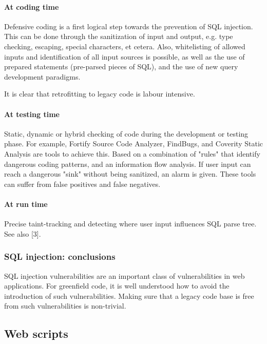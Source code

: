 \paragraph{At coding time}

Defensive coding is a first logical step towards the prevention of SQL injection. This can be done through the sanitization of input and output, e.g. type checking, escaping, special characters, et cetera. Also, whitelisting of allowed inputs and identification of all input sources is possible, as well as the use of prepared statements (pre-parsed pieces of SQL), and the use of new query development paradigms.

It is clear that retrofitting to legacy code is labour intensive.


\paragraph{At testing time}

Static, dynamic or hybrid checking of code during the development or testing phase. For example, Fortify Source Code Analyzer, FindBugs, and Coverity Static Analysis are tools to achieve this. Based on a combination of "rules" that identify dangerous coding patterns, and an information flow analysis. If user input can reach a dangerous "sink" without being sanitized, an alarm is given. These tools can suffer from false positives and false negatives.


\paragraph{At run time}

Precise taint-tracking and detecting where user input influences SQL parse tree. See also [3].


\subsubsection{SQL injection: conclusions}

SQL injection vulnerabilities are an important class of vulnerabilities in web applications. For greenfield code, it is well understood how to avoid the introduction of such vulnerabilities. Making sure that a legacy code base is free from such vulnerabilities is non-trivial.


\subsection{Web scripts}

